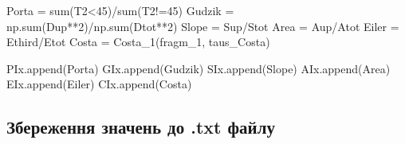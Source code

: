 \documentclass[
  letterpaper,
]{report}
\newenvironment{Shaded}{\begin{snugshade}}{\end{snugshade}}
\newcommand{\BuiltInTok}[1]{\textcolor[rgb]{0.00,0.23,0.31}{#1}}
\newcommand{\DecValTok}[1]{\textcolor[rgb]{0.68,0.00,0.00}{#1}}
\newcommand{\NormalTok}[1]{\textcolor[rgb]{0.00,0.23,0.31}{#1}}
\newcommand{\OperatorTok}[1]{\textcolor[rgb]{0.37,0.37,0.37}{#1}}
\begin{document}
\begin{Shaded}
\begin{Highlighting}[]
    
\NormalTok{    Porta }\OperatorTok{=} \BuiltInTok{sum}\NormalTok{(T2}\OperatorTok{\textless{}}\DecValTok{45}\NormalTok{)}\OperatorTok{/}\BuiltInTok{sum}\NormalTok{(T2}\OperatorTok{!=}\DecValTok{45}\NormalTok{)}
\NormalTok{    Gudzik }\OperatorTok{=}\NormalTok{ np.}\BuiltInTok{sum}\NormalTok{(Dup}\OperatorTok{**}\DecValTok{2}\NormalTok{)}\OperatorTok{/}\NormalTok{np.}\BuiltInTok{sum}\NormalTok{(Dtot}\OperatorTok{**}\DecValTok{2}\NormalTok{)}
\NormalTok{    Slope }\OperatorTok{=}\NormalTok{ Sup}\OperatorTok{/}\NormalTok{Stot}
\NormalTok{    Area }\OperatorTok{=}\NormalTok{ Aup}\OperatorTok{/}\NormalTok{Atot}
\NormalTok{    Eiler }\OperatorTok{=}\NormalTok{ Ethird}\OperatorTok{/}\NormalTok{Etot}
\NormalTok{    Costa }\OperatorTok{=}\NormalTok{ Costa\_1(fragm\_1, taus\_Costa)}
    
\NormalTok{    PIx.append(Porta)}
\NormalTok{    GIx.append(Gudzik)}
\NormalTok{    SIx.append(Slope)}
\NormalTok{    AIx.append(Area)}
\NormalTok{    EIx.append(Eiler)}
\NormalTok{    CIx.append(Costa)}
\end{Highlighting}
\end{Shaded}

\hypertarget{ux437ux431ux435ux440ux435ux436ux435ux43dux43dux44f-ux437ux43dux430ux447ux435ux43dux44c-ux434ux43e-.txt-ux444ux430ux439ux43bux443}{%
\subsection{Збереження значень до .txt
файлу}\label{ux437ux431ux435ux440ux435ux436ux435ux43dux43dux44f-ux437ux43dux430ux447ux435ux43dux44c-ux434ux43e-.txt-ux444ux430ux439ux43bux443}}
\end{document}
